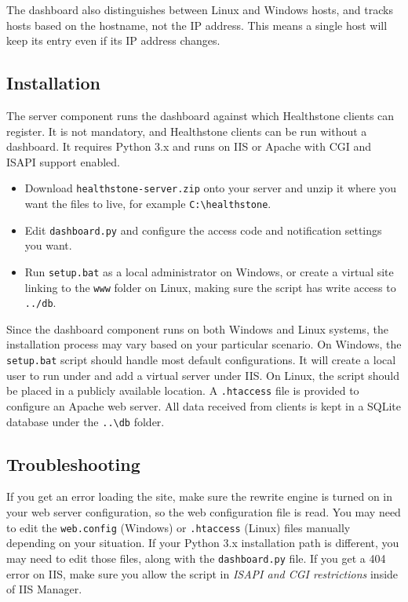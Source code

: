 \documentclass[11pt]{article}
\begin{document}
The dashboard also distinguishes between Linux and Windows hosts, and tracks hosts based on the hostname, not the IP address. This means a single host will keep its entry even if its IP address changes.

\subsection{Installation}

The server component runs the dashboard against which Healthstone clients can register. It is not mandatory, and Healthstone clients can be run without a dashboard. It requires Python 3.x and runs on IIS or Apache with CGI and ISAPI support enabled.

\begin{itemize}
\item Download \texttt{healthstone-server.zip} onto your server and unzip it where you want the files to live, for example \texttt{C:\textbackslash healthstone}.
\item Edit \texttt{dashboard.py} and configure the access code and notification settings you want.
\item Run \texttt{setup.bat} as a local administrator on Windows, or create a virtual site linking to the \texttt{www} folder on Linux, making sure the script has write access to \texttt{../db}.
\end{itemize}

Since the dashboard component runs on both Windows and Linux systems, the installation process may vary based on your particular scenario. On Windows, the \texttt{setup.bat} script should handle most default configurations. It will create a local user to run under and add a virtual server under IIS. On Linux, the script should be placed in a publicly available location. A \texttt{.htaccess} file is provided to configure an Apache web server. All data received from clients is kept in a SQLite database under the \texttt{..\textbackslash db} folder.

\subsection{Troubleshooting}

If you get an error loading the site, make sure the rewrite engine is turned on in your web server configuration, so the web configuration file is read. You may need to edit the \texttt{web.config} (Windows) or \texttt{.htaccess} (Linux) files manually depending on your situation. If your Python 3.x installation path is different, you may need to edit those files, along with the \texttt{dashboard.py} file. If you get a 404 error on IIS, make sure you allow the script in \textit{ISAPI and CGI restrictions} inside of IIS Manager.
\end{document}

